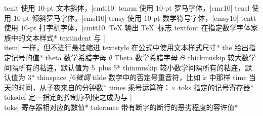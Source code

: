 \capcs tenit {使用 $10$-pt 文本斜体，|cmti10|}{}{}
\capcs tenrm {使用 $10$-pt 罗马字体，|cmr10|}{}{}
\capcs tensl {使用 $10$-pt 倾斜罗马字体，|cmsl10|}{}{}
\capcs tensy {使用 $10$-pt 数学符号字体，|cmsy10|}{}{}
\capcs tentt {使用 $10$-pt 打字机字体，|cmtt10|}{}{}
\capcs TeX {输出 \TeX\ 标志}{}{}
\capcs textfont {在指定数学字体家族中的文本样式}*{}
\capcs textindent {与 |\\item| 一样，但不进行悬挂缩进}{}{}
\capcs textstyle {在公式中使用文本样式尺寸}*{}
\capcs the {给出指定记号的值}*{}
\capcs theta {数学希腊字母 $\theta$}{}{}
\capcs Theta {数学希腊字母 $\Theta$}{}{}
\capcs thickmuskip {较大数学间隔所有的粘连，默认值为 5\mud\ plus 5\mud}*{}
\capcs thinmuskip {较小数学间隔所有的粘连，默认值为 3\mud}*{}
\capcs thinspace {/6\em 微调}{}{}
\capcs tilde {数学中的否定号重音符，比如 $\tilde x$ 中那样}{}{}
\capcs time {当天的时间，从子夜来自的分钟数}*{}
\capcs times {乘号运算符：$\times$}{}{}
\capcs toks {指定的记号寄存器}*{}
\capcs toksdef {定一指定的控制序列使之成为与 |\\toks| 寄存器相对应的数值}*{}
\capcs tolerance {带有断字的断行的恶劣程度的容许值}*{}
